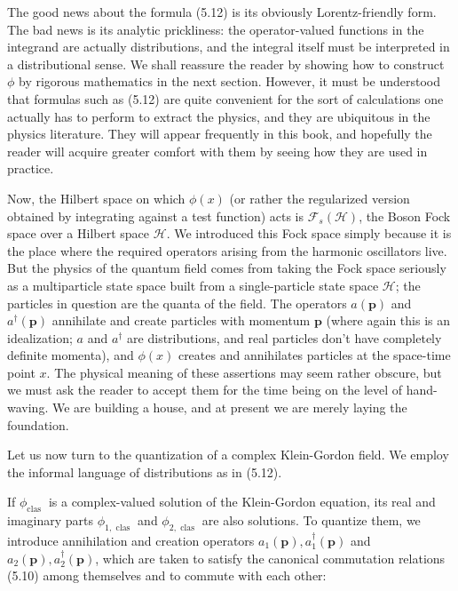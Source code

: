 \documentclass[10pt, letterpaper]{article}
\begin{document}
The good news about the formula (5.12) is its obviously Lorentz-friendly form. The bad news is its analytic prickliness: the operator-valued functions in the integrand are actually distributions, and the integral itself must be interpreted in a distributional sense. We shall reassure the reader by showing how to construct $\phi$ by rigorous mathematics in the next section. However, it must be understood that formulas such as (5.12) are quite convenient for the sort of calculations one actually has to perform to extract the physics, and they are ubiquitous in the physics literature. They will appear frequently in this book, and hopefully the reader will acquire greater comfort with them by seeing how they are used in practice.

Now, the Hilbert space on which $\phi(x)$ (or rather the regularized version obtained by integrating against a test function) acts is $\mathcal{F}_{s}(\mathcal{H})$, the Boson Fock space over a Hilbert space $\mathcal{H}$. We introduced this Fock space simply because it is the place where the required operators arising from the harmonic oscillators live. But the physics of the quantum field comes from taking the Fock space seriously as a multiparticle state space built from a single-particle state space $\mathcal{H}$; the particles in question are the quanta of the field. The operators $a(\mathbf{p})$ and $a^{\dagger}(\mathbf{p})$ annihilate and create particles with momentum $\mathbf{p}$ (where again this is an idealization; $a$ and $a^{\dagger}$ are distributions, and real particles don't have completely definite momenta), and $\phi(x)$ creates and annihilates particles at the space-time point $x$. The physical meaning of these assertions may seem rather obscure, but we must ask the reader to accept them for the time being on the level of hand-waving. We are building a house, and at present we are merely laying the foundation.


\pagebreak


Let us now turn to the quantization of a complex Klein-Gordon field. We employ the informal language of distributions as in (5.12).

If $\phi_{\text {clas }}$ is a complex-valued solution of the Klein-Gordon equation, its real and imaginary parts $\phi_{1, \text { clas }}$ and $\phi_{2, \text { clas }}$ are also solutions. To quantize them, we introduce annihilation and creation operators $a_{1}(\mathbf{p}), a_{1}^{\dagger}(\mathbf{p})$ and $a_{2}(\mathbf{p}), a_{2}^{\dagger}(\mathbf{p})$, which are taken to satisfy the canonical commutation relations (5.10) among themselves and to commute with each other:
\end{document}
